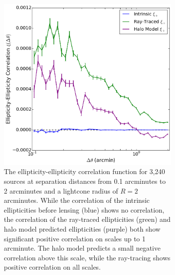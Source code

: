 \documentclass[%
 reprint,
 amsmath,amssymb,
 aps,nofootinbib
]{revtex4-1}
\begin{document}
\begin{figure}
    \centering
    \begin{subfigure}{0.475\textwidth}
        \includegraphics[width=\textwidth]{figs-swe/gg_corr.png}
        \captionsetup{justification=raggedright,singlelinecheck=false}
        \caption{The ellipticity-ellipticity correlation function for 3,240 sources at separation distances from 0.1 arcminutes to 2 arcminutes and a lightcone radius of $R=2$ arcminutes. While the correlation of the intrinsic ellipticities before lensing (blue) shows no correlation, the correlation of the ray-traced ellipticities (green) and halo model predicted ellipticities (purple) both show significant positive correlation on scales up to 1 arcminute. The halo model predicts a small negative correlation above this scale, while the ray-tracing shows positive correlation on all scales.}
        \label{gg_corr}
    \end{subfigure}
    ~~
    \begin{subfigure}{0.475\textwidth}

\end{subfigure}
\end{figure}
\end{document}
